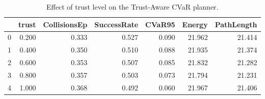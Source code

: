 \begin{table}
\caption{Effect of trust level on the Trust-Aware CVaR planner.}
\label{tab:trust}
\begin{tabular}{lrrrrrr}
\toprule
 & trust & CollisionsEp & SuccessRate & CVaR95 & Energy & PathLength \\
\midrule
0 & 0.200 & 0.333 & 0.527 & 0.090 & 21.962 & 21.414 \\
1 & 0.400 & 0.350 & 0.510 & 0.088 & 21.935 & 21.374 \\
2 & 0.600 & 0.353 & 0.507 & 0.085 & 21.832 & 21.282 \\
3 & 0.800 & 0.357 & 0.503 & 0.073 & 21.794 & 21.231 \\
4 & 1.000 & 0.368 & 0.492 & 0.060 & 21.967 & 21.406 \\
\bottomrule
\end{tabular}
\end{table}
